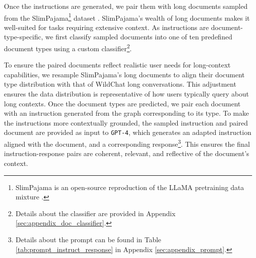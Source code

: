 Once the instructions are generated, we pair them with long documents sampled from the SlimPajama\footnote{SlimPajama is an open-source reproduction of the LLaMA pretraining data mixture \citep{touvron2023llama}.} dataset \citep{cerebras2023slimpajama}.
 SlimPajama’s wealth of long documents makes it well-suited for tasks requiring extensive context.
As instructions are document-type-specific, we first classify sampled documents into one of ten predefined document types using a custom classifier\footnote{Details about the classifier are provided in Appendix \ref{sec:appendix_doc_classifier}.}.


To ensure the paired documents reflect realistic user needs for long-context capabilities, we resample SlimPajama’s long documents to align their document type distribution with that of WildChat long conversations. This adjustment ensures the data distribution is representative of how users typically query about long contexts.
Once the document types are predicted, we pair each document with an instruction generated from the graph corresponding to its type. 
To make the instructions more contextually grounded, the sampled instruction and paired document are provided as input to {\tt GPT-4}, which generates an adapted instruction aligned with the document, and a corresponding response\footnote{Details about the prompt can be found in Table \ref{tab:prompt_instruct_response} in Appendix \ref{sec:appendix_prompt}.}. This ensures the final instruction-response pairs are coherent, relevant, and reflective of the document’s context.

